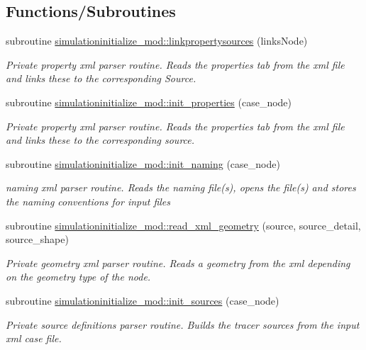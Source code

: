 \subsection*{Functions/\+Subroutines}
\begin{DoxyCompactItemize}
\item 
subroutine \mbox{\hyperlink{namespacesimulationinitialize__mod_aa4c1099b84c9901ab1286a3796a54f71}{simulationinitialize\+\_\+mod\+::linkpropertysources}} (links\+Node)
\begin{DoxyCompactList}\small\item\em Private property xml parser routine. Reads the properties tab from the xml file and links these to the corresponding Source. \end{DoxyCompactList}\item 
subroutine \mbox{\hyperlink{namespacesimulationinitialize__mod_a532cb4960e93dc27cff5dc2e04afe070}{simulationinitialize\+\_\+mod\+::init\+\_\+properties}} (case\+\_\+node)
\begin{DoxyCompactList}\small\item\em Private property xml parser routine. Reads the properties tab from the xml file and links these to the corresponding source. \end{DoxyCompactList}\item 
subroutine \mbox{\hyperlink{namespacesimulationinitialize__mod_a4909cc4cb57549e6eed3f69d6dfa30b5}{simulationinitialize\+\_\+mod\+::init\+\_\+naming}} (case\+\_\+node)
\begin{DoxyCompactList}\small\item\em naming xml parser routine. Reads the naming file(s), opens the file(s) and stores the naming conventions for input files \end{DoxyCompactList}\item 
subroutine \mbox{\hyperlink{namespacesimulationinitialize__mod_ab65ac868a57f2cc124ec29f87a239424}{simulationinitialize\+\_\+mod\+::read\+\_\+xml\+\_\+geometry}} (source, source\+\_\+detail, source\+\_\+shape)
\begin{DoxyCompactList}\small\item\em Private geometry xml parser routine. Reads a geometry from the xml depending on the geometry type of the node. \end{DoxyCompactList}\item 
subroutine \mbox{\hyperlink{namespacesimulationinitialize__mod_acaa6b217159e3a10e7db04dd7b0e4058}{simulationinitialize\+\_\+mod\+::init\+\_\+sources}} (case\+\_\+node)
\begin{DoxyCompactList}\small\item\em Private source definitions parser routine. Builds the tracer sources from the input xml case file. \end{DoxyCompactList}\item 

\end{DoxyCompactItemize}
